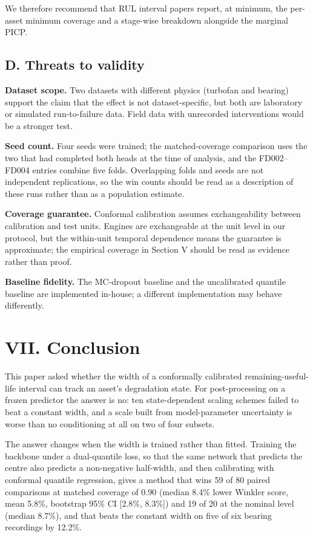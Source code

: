 We therefore recommend that RUL interval papers report, at minimum, the per-asset minimum coverage and a stage-wise breakdown alongside the marginal PICP.

\subsection{D. Threats to validity}\label{d.-threats-to-validity}

\textbf{Dataset scope.} Two datasets with different physics (turbofan and bearing) support the claim that the effect is not dataset-specific, but both are laboratory or simulated run-to-failure data. Field data with unrecorded interventions would be a stronger test.

\textbf{Seed count.} Four seeds were trained; the matched-coverage comparison uses the two that had completed both heads at the time of analysis, and the FD002--FD004 entries combine five folds. Overlapping folds and seeds are not independent replications, so the win counts should be read as a description of these runs rather than as a population estimate.

\textbf{Coverage guarantee.} Conformal calibration assumes exchangeability between calibration and test units. Engines are exchangeable at the unit level in our protocol, but the within-unit temporal dependence means the guarantee is approximate; the empirical coverage in Section V should be read as evidence rather than proof.

\textbf{Baseline fidelity.} The MC-dropout baseline and the uncalibrated quantile baseline are implemented in-house; a different implementation may behave differently.

\section{VII. Conclusion}\label{vii.-conclusion}

This paper asked whether the width of a conformally calibrated remaining-useful-life interval can track an asset's degradation state. For post-processing on a frozen predictor the answer is no: ten state-dependent scaling schemes failed to beat a constant width, and a scale built from model-parameter uncertainty is worse than no conditioning at all on two of four subsets.

The answer changes when the width is trained rather than fitted. Training the backbone under a dual-quantile loss, so that the same network that predicts the centre also predicts a non-negative half-width, and then calibrating with conformal quantile regression, gives a method that wins 59 of 80 paired comparisons at matched coverage of 0.90 (median 8.4\% lower Winkler score, mean 5.8\%, bootstrap 95\% CI {[}2.8\%, 8.3\%{]}) and 19 of 20 at the nominal level (median 8.7\%), and that beats the constant width on five of six bearing recordings by 12.2\%.

